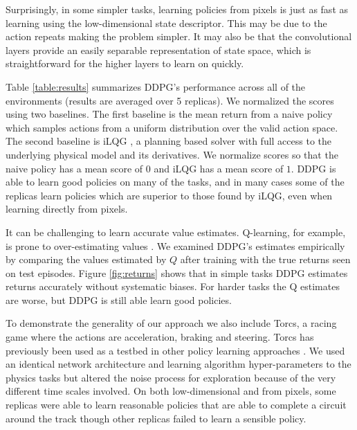 \documentclass{article} %
\begin{document}
Surprisingly, in some simpler tasks, learning policies from pixels is
just as fast as learning using the low-dimensional state
descriptor.  This may be due to the action repeats making the problem
simpler.  It may also be that the convolutional
layers provide an easily separable representation of state space,
which is straightforward for the higher layers to learn on quickly.

Table \ref{table:results} summarizes DDPG's performance across all of
the environments (results are averaged over 5
replicas).
We normalized the scores using two baselines.
The first baseline is the mean return from a naive policy
which samples actions from a uniform distribution over the valid
action space. The second baseline is iLQG
\citep{todorov2005generalized}, a planning based solver with full
access to the underlying physical model and its derivatives. We
normalize scores so that the naive policy has a mean score of $0$ and
iLQG has a mean score of $1$.
DDPG is
able to learn good policies on many of the tasks, and in many cases
some of the replicas learn policies which are superior to those found
by iLQG, even when learning directly from pixels.

It can be challenging to learn accurate value estimates. Q-learning,
for example, is prone to over-estimating values
\citep{hasselt2010double}.  We examined DDPG's estimates empirically by
comparing the values estimated by $Q$ after training with the true
returns seen on test episodes. Figure \ref{fig:returns} shows that in
simple tasks DDPG estimates returns accurately without systematic
biases. For harder tasks the Q estimates are worse, but DDPG is still
able learn good policies.



To demonstrate the generality of our approach
we also include Torcs, a racing game where the actions are acceleration,
braking
and steering. Torcs has previously been used as a testbed in other
policy learning approaches \citep{koutnik2014online}.
We used an identical network architecture and
learning algorithm hyper-parameters to the physics tasks but altered
the noise process for exploration because of the very different time
scales involved.  On both low-dimensional and from pixels, some
replicas were able to learn reasonable policies that are able to
complete a circuit around the track though other replicas failed to
learn a sensible policy.
\end{document}
